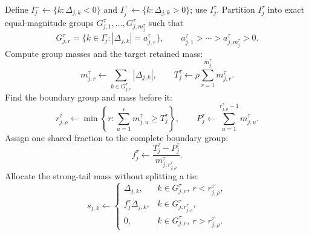 \documentclass{article} %
\begin{document}
\begin{algorithm}[H]
\begin{algorithmic}[1]
                    \State Define
                    $I_j^-\leftarrow\{k:\Delta_{j,k}<0\}$ and
                    $I_j^+\leftarrow\{k:\Delta_{j,k}>0\}$; use $I_j^\tau$.
                        \State Partition $I_j^\tau$ into exact equal-magnitude groups
                        $G_{j,1}^\tau,\dots,G_{j,m_j^\tau}^\tau$ such that
                        \[
                            G_{j,r}^\tau
                            =\{k\in I_j^\tau:|\Delta_{j,k}|=a_{j,r}^\tau\},
                            \qquad
                            a_{j,1}^\tau>\cdots>a_{j,m_j^\tau}^\tau>0.
                        \]
                        \State Compute group masses and the target retained mass:
                        \[
                            m_{j,r}^\tau\leftarrow
                            \sum_{k\in G_{j,r}^\tau}|\Delta_{j,k}|,
                            \qquad
                            T_j^\tau\leftarrow
                            \rho\sum_{r=1}^{m_j^\tau}m_{j,r}^\tau.
                        \]
                        \State Find the boundary group and mass before it:
                        \[
                            r_{j,\rho}^\tau\leftarrow
                            \min\left\{r:
                            \sum_{u=1}^{r}m_{j,u}^\tau\ge T_j^\tau\right\},
                            \qquad
                            P_j^\tau\leftarrow
                            \sum_{u=1}^{r_{j,\rho}^\tau-1}m_{j,u}^\tau.
                        \]
                        \State Assign one shared fraction to the complete boundary group:
                        \[
                            f_j^\tau\leftarrow
                            \frac{T_j^\tau-P_j^\tau}
                            {m_{j,r_{j,\rho}^\tau}^\tau}.
                        \]
                        \State Allocate the strong-tail mass without splitting a tie:
                        \[
                            s_{j,k}\leftarrow
                            \begin{cases}
                                \Delta_{j,k},
                                &k\in G_{j,r}^\tau,\ r<r_{j,\rho}^\tau,\\
                                f_j^\tau\Delta_{j,k},
                                &k\in G_{j,r_{j,\rho}^\tau}^\tau,\\
                                0,
                                &k\in G_{j,r}^\tau,\ r>r_{j,\rho}^\tau.
                            \end{cases}
                        \]
                    \EndIf
                \EndFor


\end{algorithmic}
\end{algorithm}
\end{document}
